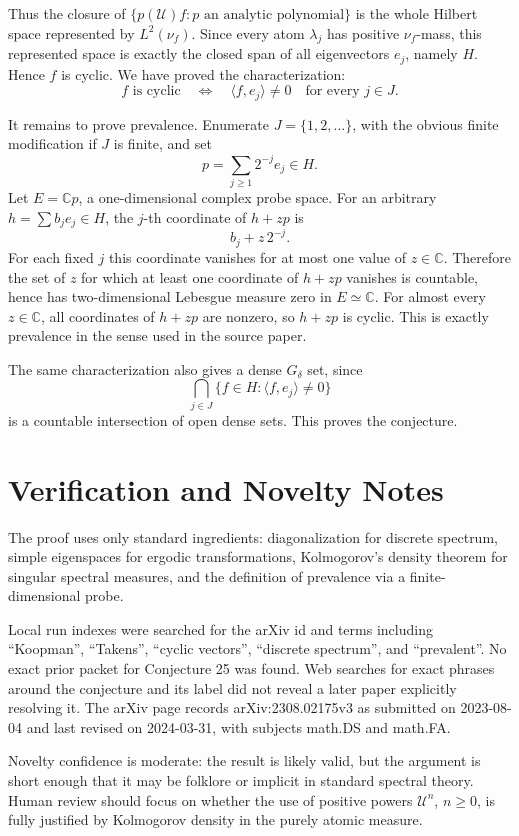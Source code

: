 \documentclass[11pt]{amsart}
\theoremstyle{remark}
\newcommand{\C}{\mathbb C}
\newcommand{\U}{\mathcal U}
\begin{document}
Thus the closure of \(\{p(\U)f:p \text{ an analytic polynomial}\}\) is the
whole Hilbert space represented by \(L^2(\nu_f)\). Since every atom
\(\lambda_j\) has positive \(\nu_f\)-mass, this represented space is exactly
the closed span of all eigenvectors \(e_j\), namely \(H\). Hence \(f\) is
cyclic. We have proved the characterization:
\[
        f\text{ is cyclic}\quad\Longleftrightarrow\quad
        \langle f,e_j\rangle\ne 0\quad\text{for every }j\in J.
\]

It remains to prove prevalence. Enumerate \(J=\{1,2,\ldots\}\), with the
obvious finite modification if \(J\) is finite, and set
\[
        p=\sum_{j\ge 1}2^{-j}e_j\in H.
\]
Let \(E=\C p\), a one-dimensional complex probe space. For an arbitrary
\(h=\sum b_j e_j\in H\), the \(j\)-th coordinate of \(h+zp\) is
\[
        b_j+z\,2^{-j}.
\]
For each fixed \(j\) this coordinate vanishes for at most one value of
\(z\in\C\). Therefore the set of \(z\) for which at least one coordinate of
\(h+zp\) vanishes is countable, hence has two-dimensional Lebesgue measure
zero in \(E\simeq\C\). For almost every \(z\in\C\), all coordinates of
\(h+zp\) are nonzero, so \(h+zp\) is cyclic. This is exactly prevalence in
the sense used in the source paper.

The same characterization also gives a dense \(G_\delta\) set, since
\[
        \bigcap_{j\in J}\{f\in H:\langle f,e_j\rangle\ne 0\}
\]
is a countable intersection of open dense sets. This proves the conjecture.

\section*{Verification and Novelty Notes}

The proof uses only standard ingredients: diagonalization for discrete
spectrum, simple eigenspaces for ergodic transformations, Kolmogorov's
density theorem for singular spectral measures, and the definition of
prevalence via a finite-dimensional probe.

Local run indexes were searched for the arXiv id and terms including
``Koopman'', ``Takens'', ``cyclic vectors'', ``discrete spectrum'', and
``prevalent''. No exact prior packet for Conjecture 25 was found. Web searches
for exact phrases around the conjecture and its label did not reveal a later
paper explicitly resolving it. The arXiv page records arXiv:2308.02175v3 as
submitted on 2023-08-04 and last revised on 2024-03-31, with subjects
math.DS and math.FA.

Novelty confidence is moderate: the result is likely valid, but the argument
is short enough that it may be folklore or implicit in standard spectral
theory. Human review should focus on whether the use of positive powers
\(\U^n\), \(n\ge0\), is fully justified by Kolmogorov density in the purely
atomic measure.
\end{document}
